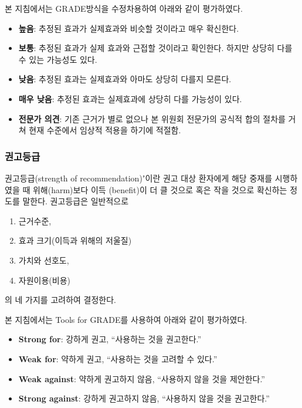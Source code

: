 \documentclass[]{book}
\providecommand{\tightlist}{%
  \setlength{\itemsep}{0pt}\setlength{\parskip}{0pt}}
\begin{document}
본 지침에서는 GRADE방식을 수정차용하여 아래와 같이 평가하였다.

\begin{itemize}
\tightlist
\item
  \textbf{높음}: 추정된 효과가 실제효과와 비슷할 것이라고 매우 확신한다.
\item
  \textbf{보통}: 추정된 효과가 실제 효과와 근접할 것이라고 확인한다. 하지만 상당히 다를 수 있는 가능성도 있다.
\item
  \textbf{낮음}: 추정된 효과는 실제효과와 아마도 상당히 다를지 모른다.
\item
  \textbf{매우 낮음}: 추정된 효과는 실제효과에 상당히 다를 가능성이 있다.
\item
  \textbf{전문가 의견}: 기존 근거가 별로 없으나 본 위원회 전문가의 공식적 합의 절차를 거쳐 현재 수준에서 임상적 적용을 하기에 적절함.
\end{itemize}

\hypertarget{section-59}{%
\subsubsection*{권고등급}\label{section-59}}

권고등급(strength of recommendation)ʼ이란
권고 대상 환자에게 해당 중재를 시행하였을 때 위해(harm)보다 이득 (benefit)이 더 클 것으로 혹은 작을 것으로 확신하는 정도를 말한다.
권고등급은 일반적으로

\begin{enumerate}
\def\labelenumi{\arabic{enumi}.}
\tightlist
\item
  근거수준,
\item
  효과 크기(이득과 위해의 저울질)
\item
  가치와 선호도,
\item
  자원이용(비용)
\end{enumerate}

의 네 가지를 고려하여 결정한다.

본 지침에서는 Tools for GRADE를 사용하여 아래와 같이 평가하였다.

\begin{itemize}
\tightlist
\item
  \textbf{Strong for}: 강하게 권고, ``사용하는 것을 권고한다.''
\item
  \textbf{Weak for}: 약하게 권고, ``사용하는 것을 고려할 수 있다.''
\item
  \textbf{Weak against}: 약하게 권고하지 않음, ``사용하지 않을 것을 제안한다.''
\item
  \textbf{Strong against}: 강하게 권고하지 않음, ``사용하지 않을 것을 권고한다.''
\end{itemize}


\end{document}
